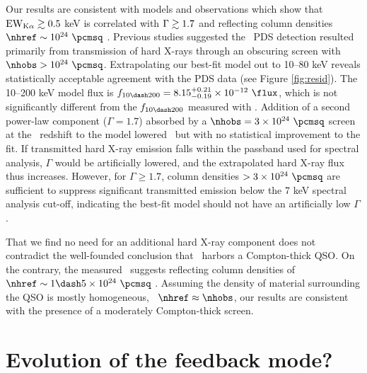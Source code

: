 \documentclass[useAMS,usenatbib]{mn2e}
\begin{document}
Our results are consistent with models and observations which show
that $\mathrm{EW}_{\mathrm{K}\alpha} \gtrsim 0.5$ keV is correlated with $\Gamma \gtrsim 1.7$ and
reflecting column densities $\nhref \sim 10^{24} ~\pcmsq$
\citep{1996MNRAS.280..823M, 1997ApJ...477..602N, 1999MNRAS.303L..11Z,
  2005A&A...444..119G}. Previous studies suggested the \bepposax\ PDS
detection resulted primarily from transmission of hard X-rays through
an obscuring screen with $\nhobs > 10^{24} ~\pcmsq$. Extrapolating our
best-fit model out to 10--80 keV reveals statistically acceptable
agreement with the PDS data (see Figure \ref{fig:resid}). The 10--200
keV model flux is $f_{10 \dash 200} = 8.15^{+0.21}_{-0.19} \times
10^{-12} ~\flux$, which is not significantly different from the $f_{10
  \dash 200}$ measured with \bepposax. Addition of a second power-law
component ($\Gamma = 1.7$) absorbed by a $\nhobs = 3 \times 10^{24}
~\pcmsq$ screen at the \irs\ redshift to the model lowered \chisq\ but
with no statistical improvement to the fit. If transmitted hard X-ray
emission falls within the passband used for spectral analysis,
$\Gamma$ would be artificially lowered, and the extrapolated hard
X-ray flux thus increases. However, for $\Gamma \ge 1.7$, column
densities $> 3 \times 10^{24} ~\pcmsq$ are sufficient to suppress
significant transmitted emission below the 7 keV spectral analysis
cut-off, indicating the best-fit model should not have an artificially
low $\Gamma$.

That we find no need for an additional hard X-ray component does not
contradict the well-founded conclusion that \irs\ harbors a
Compton-thick QSO. On the contrary, the measured \fekaew\ suggests
reflecting column densities of $\nhref \sim 1 \dash 5 \times 10^{24}
~\pcmsq$ \citep{1993MNRAS.263..314L, 2005A&A...444..119G,
  2010arXiv1005.3253C}. Assuming the density of material surrounding
the QSO is mostly homogeneous, \ie\ $\nhref \approx \nhobs$, our
results are consistent with the presence of a moderately Compton-thick
screen.

\section{Evolution of the feedback mode?}
\label{sec:evo}
\end{document}
